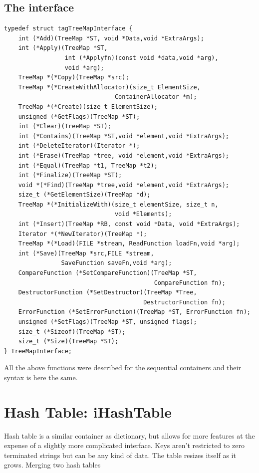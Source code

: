 \documentclass[12pt,a4paper,openany]{memoir} %
\newcommand{\container}{}
\begin{document}
{{\subsection{The interface}
\begin{verbatim}
typedef struct tagTreeMapInterface {
    int (*Add)(TreeMap *ST, void *Data,void *ExtraArgs); 
    int (*Apply)(TreeMap *ST,
                 int (*Applyfn)(const void *data,void *arg),
                 void *arg);
    TreeMap *(*Copy)(TreeMap *src);
    TreeMap *(*CreateWithAllocator)(size_t ElementSize,
                               ContainerAllocator *m);
    TreeMap *(*Create)(size_t ElementSize);
    unsigned (*GetFlags)(TreeMap *ST);
    int (*Clear)(TreeMap *ST); 
    int (*Contains)(TreeMap *ST,void *element,void *ExtraArgs);
    int (*DeleteIterator)(Iterator *);
    int (*Erase)(TreeMap *tree, void *element,void *ExtraArgs);  
    int (*Equal)(TreeMap *t1, TreeMap *t2);
    int (*Finalize)(TreeMap *ST);  
    void *(*Find)(TreeMap *tree,void *element,void *ExtraArgs);
    size_t (*GetElementSize)(TreeMap *d);
    TreeMap *(*InitializeWith)(size_t elementSize, size_t n,
                               void *Elements);
    int (*Insert)(TreeMap *RB, const void *Data, void *ExtraArgs);
    Iterator *(*NewIterator)(TreeMap *);
    TreeMap *(*Load)(FILE *stream, ReadFunction loadFn,void *arg);
    int (*Save)(TreeMap *src,FILE *stream, 
                SaveFunction saveFn,void *arg);
    CompareFunction (*SetCompareFunction)(TreeMap *ST,
                                          CompareFunction fn);
    DestructorFunction (*SetDestructor)(TreeMap *Tree,
                                       DestructorFunction fn);
    ErrorFunction (*SetErrorFunction)(TreeMap *ST, ErrorFunction fn);
    unsigned (*SetFlags)(TreeMap *ST, unsigned flags); 
    size_t (*Sizeof)(TreeMap *ST);
    size_t (*Size)(TreeMap *ST);  
} TreeMapInterface;
\end{verbatim}
All the above functions were described for the sequential containers and their syntax is here the same.
\newpage
\section{Hash Table: iHashTable}
\renewcommand{\container}{HashTable}
Hash table is a similar container as dictionary, but allows for more features at the expense of a slightly more complicated interface. 
Keys aren't restricted to zero terminated strings but can be any kind of data. 
The table resizes itself as it grows.
Merging two hash tables

}}
\end{document}
